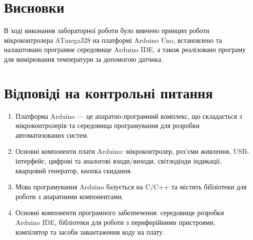 \documentclass[a4paper]{article}
\begin{document}




\section*{Висновки}
В ході виконання лабораторної роботи було вивчено принцип роботи мікроконтролера ATmega328 на платформі Arduino Uno, встановлено та налаштовано програмне середовище Arduino IDE, а також реалізовано програму для вимірювання температури за допомогою датчика.

\section*{Відповіді на контрольні питання}
\begin{enumerate}
    \item Платформа Arduino — це апаратно-програмний комплекс, що складається з мікроконтролерів та середовища програмування для розробки автоматизованих систем.
    \item Основні компоненти плати Arduino: мікроконтролер, роз'єми живлення, USB-інтерфейс, цифрові та аналогові входи/виходи, світлодіоди індикації, кварцовий генератор, кнопка скидання.
    \item Мова програмування Arduino базується на C/C++ та містить бібліотеки для роботи з апаратними компонентами.
    \item Основні компоненти програмного забезпечення: середовище розробки Arduino IDE, бібліотеки для роботи з периферійними пристроями, компілятор та засоби завантаження коду на плату.
\end{enumerate}


    
\end{document}
